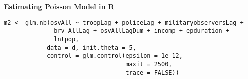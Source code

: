 \documentclass[handout]{beamer}
\begin{document}
\begin{frame}[fragile]
\textbf{Estimating Poisson Model in R}\\\vspace{3mm}
\begin{footnotesize}
\begin{verbatim}
m2 <- glm.nb(osvAll ~ troopLag + policeLag + militaryobserversLag + 
              brv_AllLag + osvAllLagDum + incomp + epduration + 
              lntpop, 
            data = d, init.theta = 5, 
            control = glm.control(epsilon = 1e-12, 
                                  maxit = 2500, 
                                  trace = FALSE))
\end{verbatim}
\end{footnotesize}
\end{frame}

\end{document}
